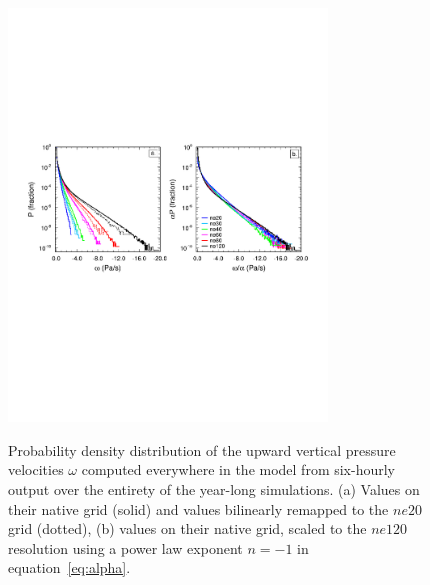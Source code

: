 \documentclass[alpha-refs]{wiley-article}
\begin{document}
\begin{figure}
\begin{center}
\noindent\includegraphics[width=20pc,angle=0]{figs/temp_2pdf.pdf}\\
\end{center}
\caption{Probability density distribution of the upward vertical pressure velocities $\omega$ computed everywhere in the model from six-hourly output over the entirety of the year-long simulations. (a) Values on their native grid (solid) and values bilinearly remapped to the $ne20$ grid (dotted), (b) values on their native grid, scaled to the $ne120$ resolution using a power law exponent $n=-1$ in equation~\ref{eq:alpha}.}
\label{fig:2pdf}
\end{figure}
\end{document}
